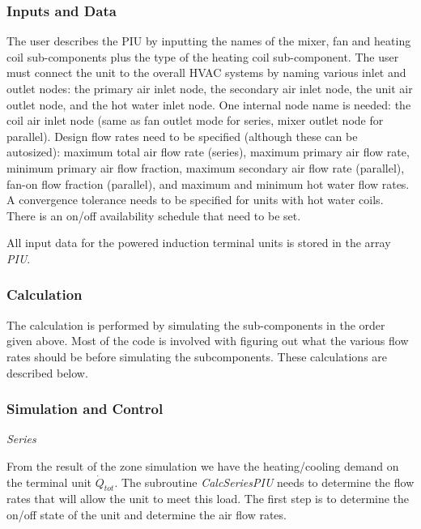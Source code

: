 \subsubsection{Inputs and Data}\label{inputs-and-data-1}

The user describes the PIU by inputting the names of the mixer, fan and heating coil sub-components plus the type of the heating coil sub-component. The user must connect the unit to the overall HVAC systems by naming various inlet and outlet nodes: the primary air inlet node, the secondary air inlet node, the unit air outlet node, and the hot water inlet node. One internal node name is needed: the coil air inlet node (same as fan outlet mode for series, mixer outlet node for parallel). Design flow rates need to be specified (although these can be autosized): maximum total air flow rate (series), maximum primary air flow rate, minimum primary air flow fraction, maximum secondary air flow rate (parallel), fan-on flow fraction (parallel), and maximum and minimum hot water flow rates. A convergence tolerance needs to be specified for units with hot water coils. There is an on/off availability schedule that need to be set.

All input data for the powered induction terminal units is stored in the array \emph{PIU}.

\subsubsection{Calculation}\label{calculation-1}

The calculation is performed by simulating the sub-components in the order given above. Most of the code is involved with figuring out what the various flow rates should be before simulating the subcomponents. These calculations are described below.

\subsubsection{Simulation and Control}\label{simulation-and-control-2}

\emph{Series}

From the result of the zone simulation we have the heating/cooling demand on the terminal unit \({\dot Q_{tot}}\). The subroutine \emph{CalcSeriesPIU} needs to determine the flow rates that will allow the unit to meet this load. The first step is to determine the on/off state of the unit and determine the air flow rates.

